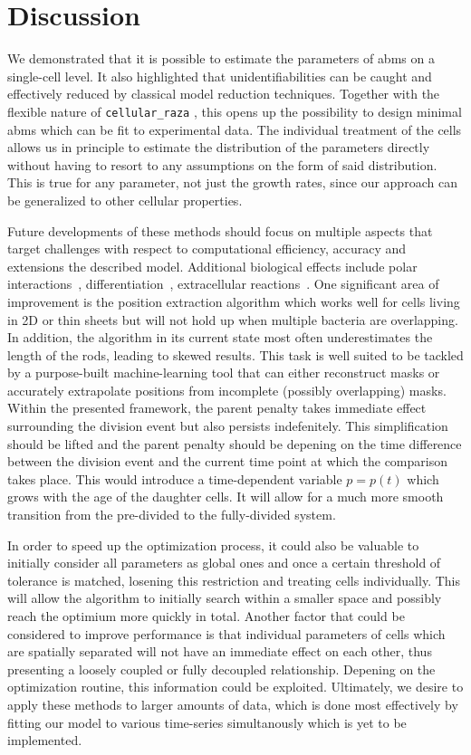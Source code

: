 \documentclass[10pt,letterpaper]{article}
\begin{document}
\section{Discussion}
We demonstrated that it is possible to estimate the parameters of \acp{abm} on a single-cell level.
It also highlighted that unidentifiabilities can be caught and effectively reduced by classical
model reduction techniques.
Together with the flexible nature of \texttt{cellular\_raza} \cite{Pleyer2025}, this opens up the
possibility to design minimal \acp{abm} which can be fit to experimental data.
The individual treatment of the cells allows us in principle to estimate the distribution of the
parameters directly without having to resort to any assumptions on the form of said distribution.
This is true for any parameter, not just the growth rates, since our approach can be generalized to
other cellular properties.

Future developments of these methods should focus on multiple aspects that target challenges with
respect to computational efficiency, accuracy and extensions the described model.
Additional biological effects include polar interactions~\cite{Duvernoy2018},
differentiation~\cite{vanGestel2015}, extracellular reactions~\cite{Li2025}.
One significant area of improvement is the position extraction algorithm which works well for cells living
in 2D or thin sheets but will not hold up when multiple bacteria are overlapping.
In addition, the algorithm in its current state most often underestimates the length of the rods,
leading to skewed results.
This task is well suited to be tackled by a purpose-built machine-learning tool that can either
reconstruct masks or accurately extrapolate positions from incomplete (possibly overlapping) masks.
Within the presented framework, the parent penalty takes immediate effect surrounding the division
event but also persists indefenitely.
This simplification should be lifted and the parent penalty should be depening on the time
difference between the division event and the current time point at which the comparison takes
place.
This would introduce a time-dependent variable $p=p(t)$ which grows with the age of the daughter cells.
It will allow for a much more smooth transition from the pre-divided to the fully-divided system.

In order to speed up the optimization process, it could also be valuable to initially consider all
parameters as global ones and once a certain threshold of tolerance is matched, losening this
restriction and treating cells individually.
This will allow the algorithm to initially search within a smaller space and possibly reach the
optimium more quickly in total.
Another factor that could be considered to improve performance is that individual parameters of
cells which are spatially separated will not have an immediate effect on each other, thus presenting
a loosely coupled or fully decoupled relationship.
Depening on the optimization routine, this information could be exploited.
Ultimately, we desire to apply these methods to larger amounts of data, which is done most
effectively by fitting our model to various time-series simultanously which is yet to be
implemented.
\end{document}
